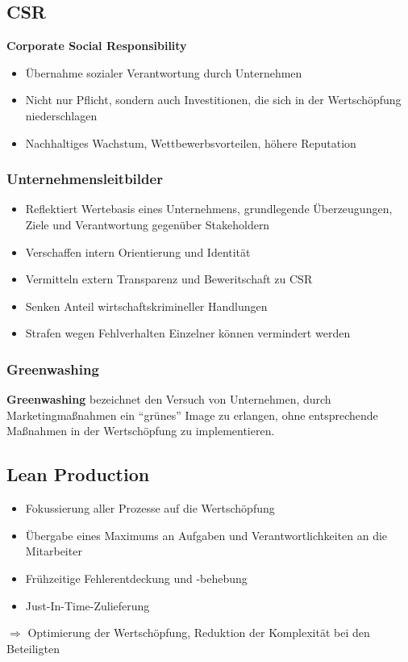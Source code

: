 \documentclass[titlepage,parskip=half]{scrartcl}
\begin{document}
\subsection{CSR}
\textbf{Corporate Social Responsibility}
\begin{itemize}
    \item Übernahme sozialer Verantwortung durch Unternehmen
    \item Nicht nur Pflicht, sondern auch Investitionen, die sich in der Wertschöpfung niederschlagen
    \item Nachhaltiges Wachstum, Wettbewerbsvorteilen, höhere Reputation
\end{itemize}

\subsubsection{Unternehmensleitbilder}
\begin{itemize}
    \item Reflektiert Wertebasis eines Unternehmens, grundlegende Überzeugungen, Ziele und Verantwortung gegenüber Stakeholdern
    \item Verschaffen intern Orientierung und Identität
    \item Vermitteln extern Transparenz und Beweritschaft zu CSR
    \item Senken Anteil wirtschaftskrimineller Handlungen
    \item Strafen wegen Fehlverhalten Einzelner können vermindert werden
\end{itemize}

\subsubsection{Greenwashing}
\textbf{Greenwashing} bezeichnet den Versuch von Unternehmen, durch Marketingmaßnahmen ein \enquote{grünes} Image zu erlangen, ohne entsprechende Maßnahmen in der Wertschöpfung zu implementieren.

\subsection{Lean Production}
\begin{itemize}
    \item Fokussierung aller Prozesse auf die Wertschöpfung
    \item Übergabe eines Maximums an Aufgaben und Verantwortlichkeiten an die Mitarbeiter
    \item Frühzeitige Fehlerentdeckung und -behebung
    \item Just-In-Time-Zulieferung
\end{itemize}
$\Rightarrow$ Optimierung der Wertschöpfung, Reduktion der Komplexität bei den Beteiligten
\end{document}
